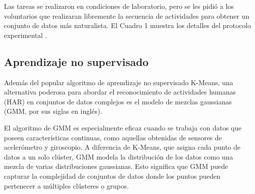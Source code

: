 \documentclass{esannV2}
\begin{document}
\begin{table}[h!]
    \centering
    \caption{Protocolo de actividades para el Experimento HAR.}
    \label{tab:har_protocol}
\end{table}

Las tareas se realizaron en condiciones de laboratorio, pero se les pidió a los voluntarios que realizaran libremente la secuencia de actividades para obtener un conjunto de datos más naturalista. El Cuadro 1 muestra los detalles del protocolo experimental \cite{esann2013}.

\subsection{Aprendizaje no supervisado}
Además del popular algoritmo de aprendizaje no supervisado K-Means, una alternativa poderosa para abordar el reconocimiento de actividades humanas (HAR) en conjuntos de datos complejos es el modelo de mezclas gaussianas (GMM, por sus siglas en inglés).

El algoritmo de GMM es especialmente eficaz cuando se trabaja con datos que poseen características continuas, como aquellas obtenidas de sensores de acelerómetro y giroscopio. A diferencia de K-Means, que asigna cada punto de datos a un solo clúster, GMM modela la distribución de los datos como una mezcla de varias distribuciones gaussianas. Esto significa que GMM puede capturar la complejidad de conjuntos de datos donde los puntos pueden pertenecer a múltiples clústeres o grupos.
\end{document}
